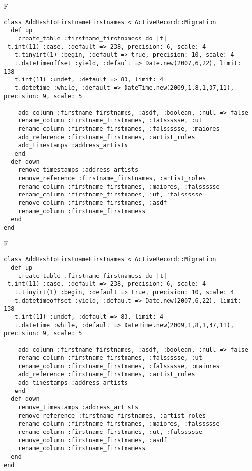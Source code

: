 F
\begin{verbatim}
class AddHashToFirstnameFirstnames < ActiveRecord::Migration
  def up
    create_table :firstname_firstnamess do |t| 
 t.int(11) :case, :default => 238, precision: 6, scale: 4
   t.tinyint(1) :begin, :default => true, precision: 10, scale: 4
   t.datetimeoffset :yield, :default => Date.new(2007,6,22), limit: 138
   t.int(11) :undef, :default => 83, limit: 4
   t.datetime :while, :default => DateTime.new(2009,1,8,1,37,11), precision: 9, scale: 5

    add_column :firstname_firstnames, :asdf, :boolean, :null => false
    rename_column :firstname_firstnames, :falssssse, :ut
    rename_column :firstname_firstnames, :falssssse, :maiores
    add_reference :firstname_firstnames, :artist_roles
    add_timestamps :address_artists
   end
  def down
    remove_timestamps :address_artists
    remove_reference :firstname_firstnames, :artist_roles
    rename_column :firstname_firstnames, :maiores, :falssssse
    rename_column :firstname_firstnames, :ut, :falssssse
    remove_column :firstname_firstnames, :asdf
    rename_column :firstname_firstnamess
  end
end
\end{verbatim}

F
\begin{verbatim}
class AddHashToFirstnameFirstnames < ActiveRecord::Migration
  def up
    create_table :firstname_firstnamess do |t| 
 t.int(11) :case, :default => 238, precision: 6, scale: 4
   t.tinyint(1) :begin, :default => true, precision: 10, scale: 4
   t.datetimeoffset :yield, :default => Date.new(2007,6,22), limit: 138
   t.int(11) :undef, :default => 83, limit: 4
   t.datetime :while, :default => DateTime.new(2009,1,8,1,37,11), precision: 9, scale: 5

    add_column :firstname_firstnames, :asdf, :boolean, :null => false
    rename_column :firstname_firstnames, :falssssse, :ut
    rename_column :firstname_firstnames, :falssssse, :maiores
    add_reference :firstname_firstnames, :artist_roles
    add_timestamps :address_artists
   end
  def down
    remove_timestamps :address_artists
    remove_reference :firstname_firstnames, :artist_roles
    rename_column :firstname_firstnames, :maiores, :falssssse
    rename_column :firstname_firstnames, :ut, :falssssse
    remove_column :firstname_firstnames, :asdf
    rename_column :firstname_firstnamess
  end
end
\end{verbatim}

